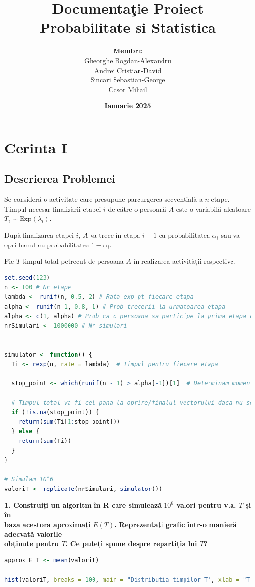 \documentclass[a4paper,11pt]{article}
\title{\Huge\textbf{Documenta\c{t}ie Proiect} \\ \Large Probabilitate si Statistica}
\author{\textbf{Membri:} \\ Gheorghe Bogdan-Alexandru \\ Andrei Cristian-David \\ Sincari Sebastian-George \\ Cosor Mihail}
\date{\textbf{Ianuarie 2025}}
\begin{document}
\begingroup
\centering
\maketitle
\endgroup

\tableofcontents

\newpage

\section*{Cerinta I}

\subsection*{Descrierea Problemei}


Se consideră o activitate care presupune parcurgerea secvențială a \( n \) etape. Timpul necesar finalizării etapei \( i \) de către o persoană \( A \) este o variabilă aleatoare \( T_i \sim \text{Exp}(\lambda_i) \).

După finalizarea etapei \( i \), \( A \) va trece în etapa \( i+1 \) cu probabilitatea \( \alpha_i \) sau va opri lucrul cu probabilitatea \( 1 - \alpha_i \).

Fie \( T \) timpul total petrecut de persoana \( A \) în realizarea activității respective.

\begin{lstlisting}[language=R]
set.seed(123)
n <- 100 # Nr etape
lambda <- runif(n, 0.5, 2) # Rata exp pt fiecare etapa
alpha <- runif(n-1, 0.8, 1) # Prob trecerii la urmatoarea etapa
alpha <- c(1, alpha) # Prob ca o persoana sa participe la prima etapa este 100%
nrSimulari <- 1000000 # Nr simulari


simulator <- function() {
  Ti <- rexp(n, rate = lambda)  # Timpul pentru fiecare etapa

  stop_point <- which(runif(n - 1) > alpha[-1])[1]  # Determinam momentul opririi

  # Timpul total va fi cel pana la oprire/finalul vectorului daca nu se opreste
  if (!is.na(stop_point)) {
    return(sum(Ti[1:stop_point])) 
  } else {
    return(sum(Ti))
  }
}

# Simulam 10^6
valoriT <- replicate(nrSimulari, simulator())
\end{lstlisting}
\textbf{1. Construiți un algoritm în R care simulează $10^6$ valori pentru v.a. $T$ și în \\baza acestora aproximați $E(T)$. Reprezentați grafic într-o manieră adecvată valorile \\obținute pentru $T$. Ce puteți spune despre repartiția lui $T$?}
\begin{lstlisting}[language=R]
approx_E_T <- mean(valoriT)

hist(valoriT, breaks = 100, main = "Distributia timpilor T", xlab = "T")
\end{lstlisting}
\end{document}
